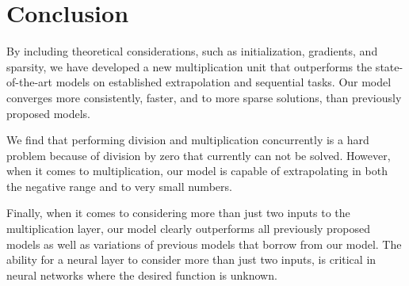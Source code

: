 \section{Conclusion}
By including theoretical considerations, such as initialization, gradients, and sparsity, we have developed a new multiplication unit that outperforms the state-of-the-art models on established extrapolation and sequential tasks. Our model converges more consistently, faster, and to more sparse solutions, than previously proposed models. 

We find that performing division and multiplication concurrently is a hard problem because of division by zero that currently can not be solved. However, when it comes to multiplication, our model is capable of extrapolating in both the negative range and to very small numbers.

Finally, when it comes to considering more than just two inputs to the multiplication layer, our model clearly outperforms all previously proposed models as well as variations of previous models that borrow from our model. The ability for a neural layer to consider more than just two inputs, is critical in neural networks where the desired function is unknown.